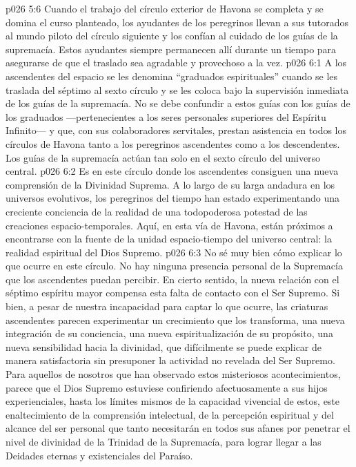 \vs p026 5:6 Cuando el trabajo del círculo exterior de Havona se completa y se domina el curso planteado, los ayudantes de los peregrinos llevan a sus tutorados al mundo piloto del círculo siguiente y los confían al cuidado de los guías de la supremacía. Estos ayudantes siempre permanecen allí durante un tiempo para asegurarse de que el traslado sea agradable y provechoso a la vez.
\vs p026 6:1 A los ascendentes del espacio se les denomina “graduados espirituales” cuando se les traslada del séptimo al sexto círculo y se les coloca bajo la supervisión inmediata de los guías de la supremacía. No se debe confundir a estos guías con los guías de los graduados ---pertenecientes a los seres personales superiores del Espíritu Infinito--- y que, con sus colaboradores servitales, prestan asistencia en todos los círculos de Havona tanto a los peregrinos ascendentes como a los descendentes. Los guías de la supremacía actúan tan solo en el sexto círculo del universo central.
\vs p026 6:2 Es en este círculo donde los ascendentes consiguen una nueva comprensión de la Divinidad Suprema. A lo largo de su larga andadura en los universos evolutivos, los peregrinos del tiempo han estado experimentando una creciente conciencia de la realidad de una todopoderosa potestad de las creaciones espacio\hyp{}temporales. Aquí, en esta vía de Havona, están próximos a encontrarse con la fuente de la unidad espacio\hyp{}tiempo del universo central: la realidad espiritual del Dios Supremo.
\vs p026 6:3 No sé muy bien cómo explicar lo que ocurre en este círculo. No hay ninguna presencia personal de la Supremacía que los ascendentes puedan percibir. En cierto sentido, la nueva relación con el séptimo espíritu mayor compensa esta falta de contacto con el Ser Supremo. Si bien, a pesar de nuestra incapacidad para captar lo que ocurre, las criaturas ascendentes parecen experimentar un crecimiento que los transforma, una nueva integración de su conciencia, una nueva espiritualización de su propósito, una nueva sensibilidad hacia la divinidad, que difícilmente se puede explicar de manera satisfactoria sin presuponer la actividad no revelada del Ser Supremo. Para aquellos de nosotros que han observado estos misteriosos acontecimientos, parece que el Dios Supremo estuviese confiriendo afectuosamente a sus hijos experienciales, hasta los límites mismos de la capacidad vivencial de estos, este enaltecimiento de la comprensión intelectual, de la percepción espiritual y del alcance del ser personal que tanto necesitarán en todos sus afanes por penetrar el nivel de divinidad de la Trinidad de la Supremacía, para lograr llegar a las Deidades eternas y existenciales del Paraíso.
